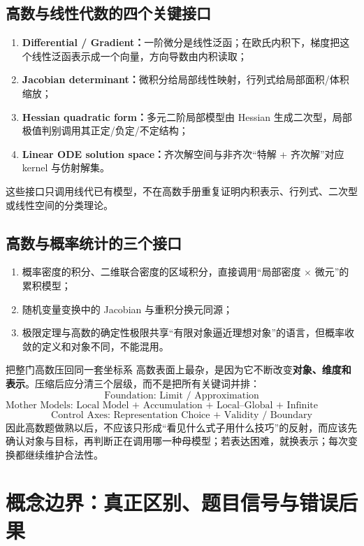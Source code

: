 \documentclass[11pt,a4paper,openany]{ctexbook}
\newcommand{\key}[1]{\textbf{\color{deep}#1}}
\begin{document}
\section{高数与线性代数的四个关键接口}
\begin{enumerate}
  \item \key{Differential / Gradient：}一阶微分是线性泛函；在欧氏内积下，梯度把这个线性泛函表示成一个向量，方向导数由内积读取；
  \item \key{Jacobian determinant：}微积分给局部线性映射，行列式给局部面积/体积缩放；
  \item \key{Hessian quadratic form：}多元二阶局部模型由 Hessian 生成二次型，局部极值判别调用其正定/负定/不定结构；
  \item \key{Linear ODE solution space：}齐次解空间与非齐次“特解 + 齐次解”对应 kernel 与仿射解集。
\end{enumerate}
这些接口只调用线代已有模型，不在高数手册重复证明内积表示、行列式、二次型或线性空间的分类理论。

\section{高数与概率统计的三个接口}
\begin{enumerate}
  \item 概率密度的积分、二维联合密度的区域积分，直接调用“局部密度 $\times$ 微元”的累积模型；
  \item 随机变量变换中的 Jacobian 与重积分换元同源；
  \item 极限定理与高数的确定性极限共享“有限对象逼近理想对象”的语言，但概率收敛的定义和对象不同，不能混用。
\end{enumerate}

\begin{corebox}{把整门高数压回同一套坐标系}
高数表面上最杂，是因为它不断改变\key{对象、维度和表示}。压缩后应分清三个层级，而不是把所有关键词并排：
\[
\boxed{\text{Foundation: Limit / Approximation}}
\]
\[
\boxed{\text{Mother Models: Local Model + Accumulation + Local--Global + Infinite Construction + Dynamics}}
\]
\[
\boxed{\text{Control Axes: Representation Choice + Validity / Boundary}}
\]
因此高数题做熟以后，不应该只形成“看见什么式子用什么技巧”的反射，而应该先确认对象与目标，再判断正在调用哪一种母模型；若表达困难，就换表示；每次变换都继续维护合法性。
\end{corebox}

\chapter{概念边界：真正区别、题目信号与错误后果}
\end{document}
